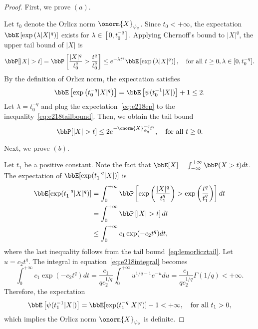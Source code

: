\documentclass[11pt]{article}
\newcommand{\of}[1]{\left(#1\right)}
\newcommand{\off}[1]{\left[#1\right]}
\theoremstyle{plain}
\theoremstyle{definition}
\begin{document}
    \begin{proof}
    	First, we prove $(a)$.
    	
    	\vspace{0.2cm}
    	
    	Let $t_0$ denote the Orlicz norm $\onorm{X}_{\psi_q}$. Since $t_0 < +\infty$, the expectation $ \bbE \off{ \exp \of{\lambda |X|^q} }$ exists for $\lambda \in  [0,t^{-q}_0]$. Applying Chernoff's bound to $|X|^q$, the upper tail bound of $|X|$ is
    	\begin{equation}\label{eq:e218tailbound}
    		\bbP [|X|>t] = \bbP \off{\frac{|X|^q}{t^q_0} > \frac{t^q}{t^q_0}} \leq e^{-\lambda t^q} \bbE \off{ \exp \of{\lambda |X|^q} }, \quad \text{for all } t\geq 0, \lambda\in [0,t^{-q}_0].
    	\end{equation}
    	 By the definition of Orlicz norm, the expectation satisfies
    	\begin{equation}\label{eq:e218ep}
    		\bbE \off{ \exp \of{ t^{-q}_0|X|^q} } = \bbE \off{ \psi( t^{-1}_0 |X| )} + 1 \leq 2.
    	\end{equation}
    	Let $\lambda = t^{-q}_0$ and plug the expectation~\eqref{eq:e218ep} to the inequality~\eqref{eq:e218tailbound}. Then, we obtain the tail bound
    	\begin{equation}
    		\bbP [|X|>t] \leq 2 e^{- \onorm{X}^{-q}_{\psi_q} t^q },\quad 
    		\text{for all }  t \geq 0.
    	\end{equation}
    	
    	\vspace{0.2cm}
    	Next, we prove $(b)$.
    	
    	\vspace{0.2cm}
     Let $t_1$ be a positive constant. 	Note the fact that $\bbE[X] = \int_{-\infty}^{+\infty} \bbP(X >t) dt  $. The expectation of $\bbE[ \exp(t^{-q}_1 |X| )  ]$ is
    	\begin{align}
    		\bbE[ \exp(t^{-q}_1 |X|^q )  ] &= \int_{0}^{+\infty} \bbP \off{ \exp \of{\frac{|X|^q}{t^q_1}} > \exp \of{\frac{t^q}{t^q_1}} } dt \\
    		& = \int_{0}^{+\infty} \bbP \off{ |X| > t } dt \\
    		& \leq  \int_{0}^{+\infty} c_1 \exp(-c_2 t^q) dt\label{eq:e218integral},
       	\end{align}
       	where the last inequality follows from the tail bound~\eqref{eq:lemorlicztail}. Let $u = c_2 t^q$. The integral in equation~\eqref{eq:e218integral} becomes
       	\[  \int_{0}^{+\infty} c_1 \exp(-c_2 t^q) dt = \frac{c_1}{q c_2^{1/q}} \int_{0}^{+\infty} u^{1/q-1}e^{-u} du =  \frac{c_1}{q c_2^{1/q}} \Gamma(1/q) < +\infty.  \]
       	Therefore, the expectation 
       	\begin{equation}
       		\bbE \off{ \psi(t_1^{-1} |X| )} =  \bbE[ \exp(t^{-q}_1 |X|^q )  ] - 1 < +\infty, \quad \text{for all } t_1 > 0,
       	\end{equation}
       	which implies the Orlicz norm $\onorm{X}_{\psi_q}$ is definite.
    \end{proof}
    
\end{document}
